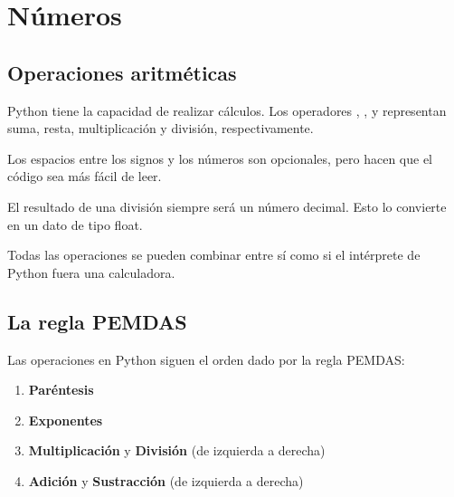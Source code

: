 \chapter{Números}

\section{Operaciones aritméticas}

Python tiene la capacidad de realizar cálculos.
Los operadores \ttt{+}, \ttt{-}, \ttt{*} y \ttt{/} representan suma, resta, multiplicación y división, respectivamente.


Los espacios entre los signos y los números son opcionales, pero hacen que el código sea más fácil de leer.

El resultado de una división siempre será un número decimal.
Esto lo convierte en un dato de tipo float.


Todas las operaciones se pueden combinar entre sí como si el intérprete de Python fuera una calculadora.


\section{La regla PEMDAS}

Las operaciones en Python siguen el orden dado por la regla PEMDAS:

\begin{enumerate}
  \item \textbf{Paréntesis} \ttt{()}
  
  \item \textbf{Exponentes} \ttt{**}
  
  \item \textbf{Multiplicación} \ttt{*} y \textbf{División} \ttt{/} (de izquierda a derecha)
  
  \item \textbf{Adición} \ttt{+} y \textbf{Sustracción} \ttt{-} (de izquierda a derecha)
  
\end{enumerate}

